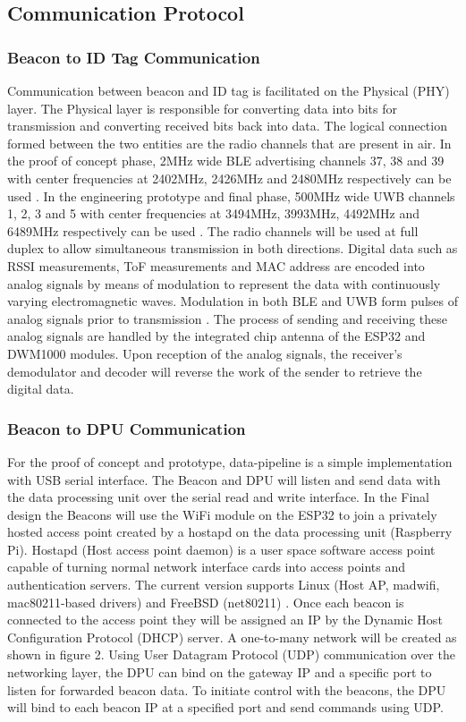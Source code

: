 \pagebreak
\subsection{Communication Protocol}
\subsubsection{Beacon to ID Tag Communication}
\medskip
Communication between beacon and ID tag is facilitated on the Physical (PHY) layer. The Physical layer is responsible for converting data into bits for transmission and converting received bits back into data. The logical connection formed between the two entities are the radio channels that are present in air. In the proof of concept phase, 2MHz wide BLE advertising channels 37, 38 and 39 with center frequencies at 2402MHz, 2426MHz and 2480MHz respectively can be used \cite{R4-2-3}. In the engineering prototype and final phase, 500MHz wide UWB channels 1, 2, 3 and 5 with center frequencies at 3494MHz, 3993MHz, 4492MHz and 6489MHz respectively can be used \cite{R4-2-2}. The radio channels will be used at full duplex to allow simultaneous transmission in both directions. Digital data such as RSSI measurements, ToF measurements and MAC address are encoded into analog signals by means of modulation to represent the data with continuously varying electromagnetic waves. Modulation in both BLE and UWB form pulses of analog signals prior to transmission \cite{R4-2-3}. The process of sending and receiving these analog signals are handled by the integrated chip antenna of the ESP32 and DWM1000 modules. Upon reception of the analog signals, the receiver's demodulator and decoder will reverse the work of the sender to retrieve the digital data. 



\pagebreak
\subsubsection{Beacon to DPU Communication}
\medskip
For the proof of concept and prototype, data-pipeline is a simple implementation with USB serial interface. The Beacon and DPU will listen and send data with the data processing unit over the serial read and write interface. In the Final design the Beacons will use the WiFi module on the ESP32 to join a privately hosted access point created by a hostapd on the data processing unit (Raspberry Pi). Hostapd (Host access point daemon) is a user space software access point capable of turning normal network interface cards into access points and authentication servers. The current version supports Linux (Host AP, madwifi, mac80211-based drivers) and FreeBSD (net80211) \cite{R4-1-2-1}. Once each beacon is connected to the access point they will be assigned an IP by the Dynamic Host Configuration Protocol (DHCP) server. A one-to-many network will be created as shown in figure 2. Using User Datagram Protocol (UDP) communication over the networking layer, the DPU can bind on the gateway IP and a specific port to listen for forwarded beacon data. To initiate control with the beacons, the DPU will bind to each beacon IP at a specified port and send commands using UDP.

